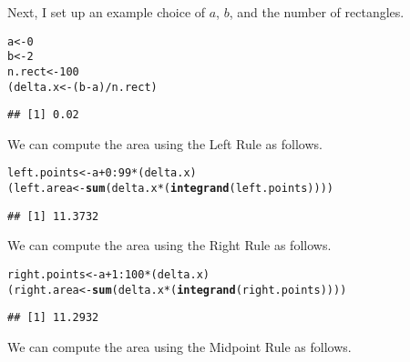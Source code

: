 \documentclass{article}\usepackage[]{graphicx}\usepackage[]{xcolor}
\makeatletter
\newcommand{\hlnum}[1]{\textcolor[rgb]{0.686,0.059,0.569}{#1}}%
\newcommand{\hlopt}[1]{\textcolor[rgb]{0,0,0}{#1}}%
\newcommand{\hldef}[1]{\textcolor[rgb]{0.345,0.345,0.345}{#1}}%
\newcommand{\hlkwb}[1]{\textcolor[rgb]{0.69,0.353,0.396}{#1}}%
\newcommand{\hlkwd}[1]{\textcolor[rgb]{0.737,0.353,0.396}{\textbf{#1}}}%
\newenvironment{kframe}{%
 \def\at@end@of@kframe{}%
 \ifinner\ifhmode%
  \def\at@end@of@kframe{\end{minipage}}%
  \begin{minipage}{\columnwidth}%
 \fi\fi%
 \def\FrameCommand##1{\hskip\@totalleftmargin \hskip-\fboxsep
 \colorbox{shadecolor}{##1}\hskip-\fboxsep
     \hskip-\linewidth \hskip-\@totalleftmargin \hskip\columnwidth}%
 \MakeFramed {\advance\hsize-\width
   \@totalleftmargin\z@ \linewidth\hsize
   \@setminipage}}%
 {\par\unskip\endMakeFramed%
 \at@end@of@kframe}
\newenvironment{knitrout}{}{} %
\makeatother
\begin{document}
\begin{enumerate}
\begin{knitrout}
\end{knitrout}
Next, I set up an example choice of $a$, $b$, and the number of rectangles.
\begin{knitrout}\scriptsize
{}\color{fgcolor}\begin{kframe}
\begin{alltt}
\hldef{a} \hlkwb{<-} \hlnum{0}
\hldef{b} \hlkwb{<-} \hlnum{2}
\hldef{n.rect} \hlkwb{<-} \hlnum{100}
\hldef{(delta.x} \hlkwb{<-} \hldef{(b}\hlopt{-}\hldef{a)}\hlopt{/}\hldef{n.rect)}
\end{alltt}
\begin{verbatim}
## [1] 0.02
\end{verbatim}
\end{kframe}
\end{knitrout}
We can compute the area using the Left Rule as follows.
\begin{knitrout}\scriptsize
{}\color{fgcolor}\begin{kframe}
\begin{alltt}
\hldef{left.points} \hlkwb{<-} \hldef{a} \hlopt{+} \hlnum{0}\hlopt{:}\hlnum{99}\hlopt{*}\hldef{(delta.x)}
\hldef{(left.area} \hlkwb{<-} \hlkwd{sum}\hldef{(delta.x}\hlopt{*}\hldef{(}\hlkwd{integrand}\hldef{(left.points))))}
\end{alltt}
\begin{verbatim}
## [1] 11.3732
\end{verbatim}
\end{kframe}
\end{knitrout}
We can compute the area using the Right Rule as follows.
\begin{knitrout}\scriptsize
{}\color{fgcolor}\begin{kframe}
\begin{alltt}
\hldef{right.points} \hlkwb{<-} \hldef{a} \hlopt{+} \hlnum{1}\hlopt{:}\hlnum{100}\hlopt{*}\hldef{(delta.x)}
\hldef{(right.area} \hlkwb{<-} \hlkwd{sum}\hldef{(delta.x}\hlopt{*}\hldef{(}\hlkwd{integrand}\hldef{(right.points))))}
\end{alltt}
\begin{verbatim}
## [1] 11.2932
\end{verbatim}
\end{kframe}
\end{knitrout}
We can compute the area using the Midpoint Rule as follows.
\begin{knitrout}\scriptsize
{}\color{fgcolor}\begin{kframe}

\end{kframe}
\end{knitrout}
\end{enumerate}
\end{document}
